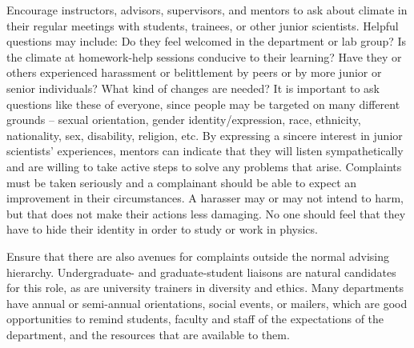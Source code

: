 Encourage instructors, advisors, supervisors, and mentors to ask about climate in their regular meetings with students, trainees, or other junior scientists. Helpful questions may include: Do they feel welcomed in the department or lab group? Is the climate at homework-help sessions conducive to their learning? Have they or others experienced harassment or belittlement by peers or by more junior or senior individuals? What kind of changes are needed? It is important to ask questions like these of everyone, since people may be targeted on many different grounds -- sexual orientation, gender identity/expression, race, ethnicity, nationality, sex, disability, religion, etc. By expressing a sincere interest in junior scientists' experiences, mentors can indicate that they will listen sympathetically and are willing to take active steps to solve any problems that arise. Complaints must be taken seriously and a complainant should be able to expect an improvement in their circumstances. A harasser may or may not intend to harm, but that does not make their actions less damaging. No one should feel that they have to hide their identity in order to study or work in physics.

Ensure that there are also avenues for complaints outside the normal advising hierarchy. Undergraduate- and graduate-student liaisons are natural candidates for this role, as are university trainers in diversity and ethics. Many departments have annual or semi-annual orientations, social events, or mailers, which are good opportunities to remind students, faculty and staff of the expectations of the department, and the resources that are available to them.




























